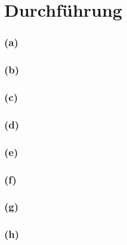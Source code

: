 \section{Durchführung}
\label{sec:Durchführung}

\subsubsection{(a)}
\label{subsubsec:durchfuehrung_a}


\subsubsection{(b)}
\label{subsubsec:durchfuehrung_b}


\subsubsection{(c)}
\label{subsubsec:durchfuehrung_c}


\subsubsection{(d)}
\label{subsubsec:durchfuehrung_d}


\subsubsection{(e)}
\label{subsubsec:durchfuehrung_e}


\subsubsection{(f)}
\label{subsubsec:durchfuehrung_f}


\subsubsection{(g)}
\label{subsubsec:durchfuehrung_g}


\subsubsection{(h)}
\label{subsubsec:durchfuehrung_h}

